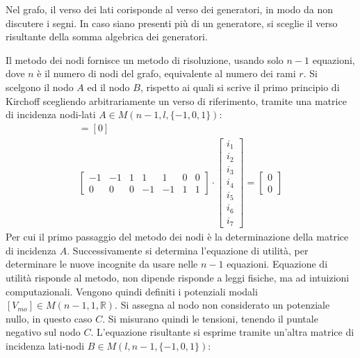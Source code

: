 \documentclass{article}
\numberwithin{equation}{subsection}
\begin{document}
Nel grafo, il verso dei lati corisponde al verso dei generatori, in modo da non discutere i segni. In caso siano presenti più di un generatore, si sceglie il verso risultante 
della somma algebrica dei generatori. %



Il metodo dei nodi fornisce un metodo di risoluzione, usando solo $n-1$ equazioni, dove $n$ è il numero di nodi del grafo, equivalente al numero dei rami $r$. 
Si scelgono il nodo $A$ ed il nodo $B$, rispetto ai quali si scrive il primo principio di Kirchoff scegliendo arbitrariamente un verso di riferimento, tramite una matrice di 
incidenza nodi-lati $A\in M(n-1,l,\{-1,0,1\})$:
\begin{gather*}
    [A][i_l]=[0]\\
    \begin{bmatrix}
        -1&-1&1&1&1&0&0\\
        0&0&0&-1&-1&1&1
    \end{bmatrix}\cdot\begin{bmatrix}
        i_1\\
        i_2\\
        i_3\\
        i_4\\
        i_5\\
        i_6\\
        i_7
    \end{bmatrix}=\begin{bmatrix}
        0\\
        0
    \end{bmatrix}
\end{gather*}
Per cui il primo passaggio del metodo dei nodi è la determinazione della matrice di incidenza $A$. Successivamente si determina l'equazione di utilità, per determinare le nuove 
incognite da usare nelle $n-1$ equazioni. Equazione di utilità risponde al metodo, non dipende risponde a leggi fisiche, ma ad intuizioni computazionali. 
Vengono quindi definiti i potenziali modali $[V_{mo}]\in M(n-1,1,\mathbb{R})$. Si assegna al nodo non considerato un potenziale nullo, in questo caso $C$. 
Si misurano quindi le tensioni, tenendo il puntale negativo sul nodo $C$. L'equazione risultante si esprime tramite un'altra matrice di incidenza lati-nodi $B\in M(l,n-1,\{-1,0,1\})$: 
\end{document}
